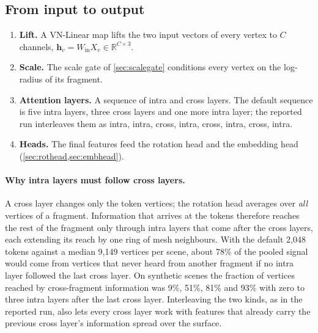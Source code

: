 \documentclass[11pt,a4paper]{article}
\theoremstyle{remark}
\newcommand{\R}{\mathbb{R}}
\begin{document}
\subsection{From input to output}
\begin{enumerate}
  \item \textbf{Lift.} A VN-Linear map lifts the two input vectors of every vertex to $C$ channels, $\mathbf h_v=W_{\mathrm{in}}X_v\in\R^{C\times3}$.
  \item \textbf{Scale.} The scale gate of \cref{sec:scalegate} conditions every vertex on the log-radius of its fragment.
  \item \textbf{Attention layers.} A sequence of intra and cross layers. The default sequence is five intra layers, three cross layers and one more intra layer; the reported run interleaves them as intra, intra, cross, intra, cross, intra, cross, intra.
  \item \textbf{Heads.} The final features feed the rotation head and the embedding head (\cref{sec:rothead,sec:embhead}).
\end{enumerate}

\paragraph{Why intra layers must follow cross layers.} A cross layer changes only the token vertices; the rotation head averages over \emph{all} vertices of a fragment. Information that arrives at the tokens therefore reaches the rest of the fragment only through intra layers that come after the cross layers, each extending its reach by one ring of mesh neighbours. With the default 2{,}048 tokens against a median 9{,}149 vertices per scene, about 78\% of the pooled signal would come from vertices that never heard from another fragment if no intra layer followed the last cross layer. On synthetic scenes the fraction of vertices reached by cross-fragment information was 9\%, 51\%, 81\% and 93\% with zero to three intra layers after the last cross layer. Interleaving the two kinds, as in the reported run, also lets every cross layer work with features that already carry the previous cross layer's information spread over the surface.
\end{document}
